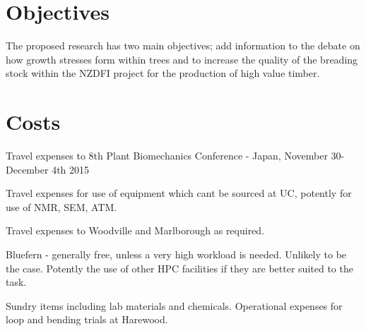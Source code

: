 \documentclass{article}
\begin{document}
\section{Objectives}
The proposed research has two main objectives; add information to the
debate on how growth stresses form within trees and to increase the quality of
the breading stock within the NZDFI project for the production of high value
timber.

\section{Costs}
Travel expenses to 8th Plant Biomechanics Conference - Japan, November
30-December 4th 2015

Travel expenses for use of equipment which cant be sourced at UC,
potently for use of NMR, SEM, ATM.

Travel expenses to Woodville and Marlborough as required.

Bluefern - generally free, unless a very high workload is needed. Unlikely to be
the case. Potently the use of other HPC facilities if they are better suited to
the task.

Sundry items including lab materials and chemicals. Operational
expenses for loop and bending trials at Harewood.
\end{document}
